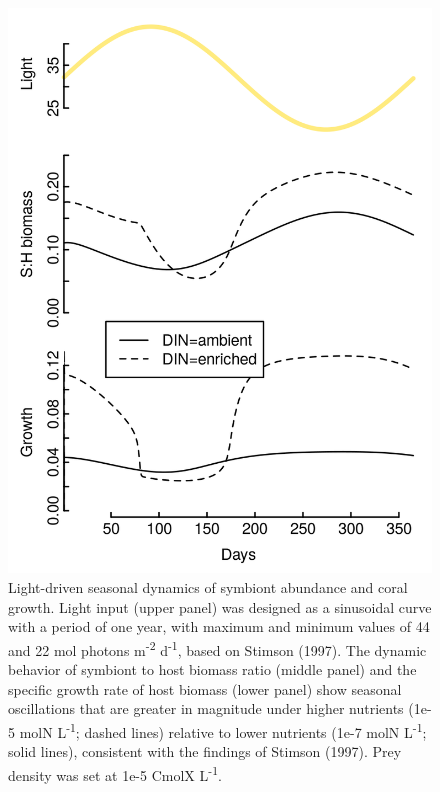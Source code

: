 \documentclass[]{elsarticle} %
\makeatletter
\def\maxwidth{\ifdim\Gin@nat@width>\linewidth\linewidth
\else\Gin@nat@width\fi}
\let\Oldincludegraphics\includegraphics
\renewcommand{\includegraphics}[1]{\Oldincludegraphics[width=\maxwidth]{#1}}
\makeatother
\begin{document}
\begin{figure}[htbp]
\centering
\includegraphics{../img/Fig5.png}
\caption{Light-driven seasonal dynamics of symbiont abundance and coral
growth. Light input (upper panel) was designed as a sinusoidal curve
with a period of one year, with maximum and minimum values of 44 and 22
mol photons m\textsuperscript{-2} d\textsuperscript{-1}, based on
Stimson (1997). The dynamic behavior of symbiont to host biomass ratio
(middle panel) and the specific growth rate of host biomass (lower
panel) show seasonal oscillations that are greater in magnitude under
higher nutrients (1e-5 molN L\textsuperscript{-1}; dashed lines)
relative to lower nutrients (1e-7 molN L\textsuperscript{-1}; solid
lines), consistent with the findings of Stimson (1997). Prey density was
set at 1e-5 CmolX L\textsuperscript{-1}.}
\end{figure}
\end{document}

